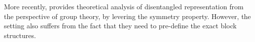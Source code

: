More recently, \cite{cohen2014learning} provides theoretical analysis of disentangled representation from the perspective of group theory, by levering the symmetry property. However, the setting also suffers from the fact that they need to pre-define the exact block structures.












